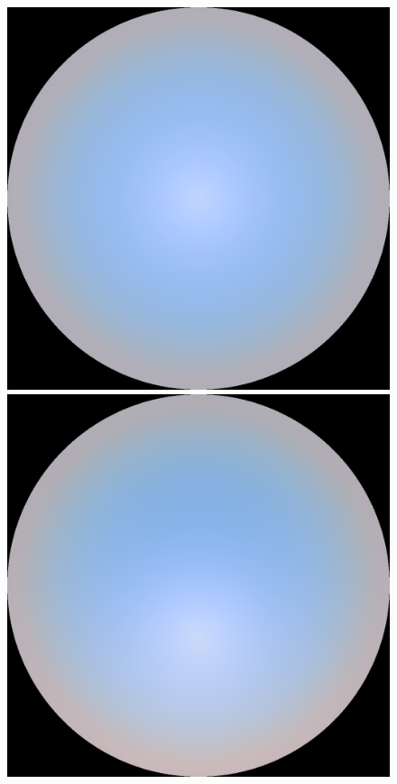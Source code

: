 \begin{figure}
{ }
 \subtop
 {
 \includegraphics[scale=0.125]{figures/preetham_sRGB_D65_turbidity_4_thetaSun_0.png}
 }
 \hfill
 \subtop
 {
 \includegraphics[scale=0.125]{figures/preetham_sRGB_D65_turbidity_4_thetaSun_30.png}
}
\end{figure}
